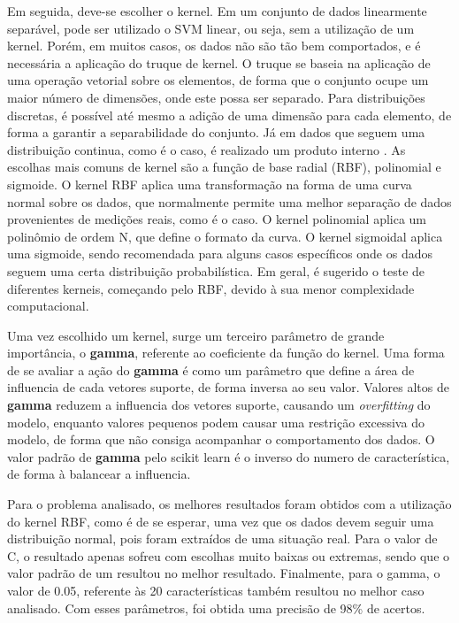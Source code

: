 Em seguida, deve-se escolher o kernel. Em um conjunto de dados linearmente separável, pode ser utilizado o SVM linear, ou seja, sem a utilização de um kernel. Porém, em muitos casos, os dados não são tão bem comportados, e é necessária a aplicação do truque de kernel. O truque se baseia na aplicação de uma operação vetorial sobre os elementos, de forma que o conjunto ocupe um maior número de dimensões, onde este possa ser separado. Para distribuições discretas, é possível até mesmo a adição de uma dimensão para cada elemento, de forma a garantir a separabilidade do conjunto. Já em dados que seguem uma distribuição continua, como é o caso, é realizado um produto interno
.
As escolhas mais comuns de kernel são a função de base radial (RBF), polinomial e sigmoide. O kernel RBF aplica uma transformação na forma de uma curva normal sobre os dados, que normalmente permite uma melhor separação de dados provenientes de medições reais, como é o caso. O kernel polinomial aplica um polinômio de ordem N, que define o formato da curva. O kernel sigmoidal aplica uma sigmoide, sendo recomendada para alguns casos específicos onde os dados seguem uma certa distribuição probabilística. Em geral, é sugerido o teste de diferentes kerneis, começando pelo RBF, devido à sua menor complexidade computacional.

Uma vez escolhido um kernel, surge um terceiro parâmetro de grande importância, o \textbf{gamma}, referente ao coeficiente da função do kernel. Uma forma de se avaliar a ação do \textbf{gamma} é como um parâmetro que define a área de influencia de cada vetores suporte, de forma inversa ao seu valor. Valores altos de \textbf{gamma} reduzem a influencia dos vetores suporte, causando um \emph{overfitting} do modelo, enquanto valores pequenos podem causar uma restrição excessiva do modelo, de forma que não consiga acompanhar o comportamento dos dados. O valor padrão de \textbf{gamma} pelo scikit learn é o inverso do numero de característica, de forma à balancear a influencia.

Para o problema analisado, os melhores resultados foram obtidos com a utilização do kernel RBF, como é de se esperar, uma vez que os dados devem seguir uma distribuição normal, pois foram extraídos de uma situação real. Para o valor de C, o resultado apenas sofreu com escolhas muito baixas ou extremas, sendo que o valor padrão de um resultou no melhor resultado. Finalmente, para o gamma, o valor de 0.05, referente às 20 características também resultou no melhor caso analisado. Com esses parâmetros, foi obtida uma precisão de 98\% de acertos.


